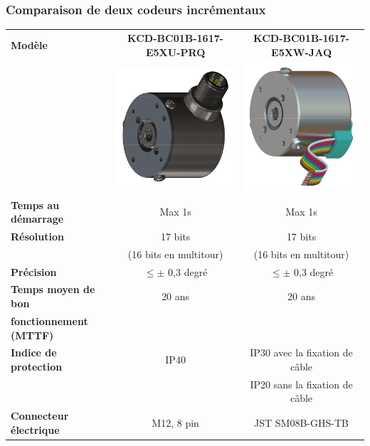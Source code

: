 \documentclass{article}
\begin{document}
    \subsubsection{Comparaison de deux codeurs incrémentaux}
    \begin{table}[H]
        \centering
        \begin{tabular}{l|c|c}
        \textbf{Modèle}
            & \textbf{KCD-BC01B-1617-E5XU-PRQ}
            & \textbf{KCD-BC01B-1617-E5XW-JAQ}\\
            & \includegraphics[width=0.2\linewidth]{./images/hall-KCD-BC01_B-1_617-E5XU-PRQ.png}
            & \includegraphics[width=0.2\linewidth]{./images/hall-KCD-S10_1B-1617-F7_XU-PRQ.png}\\
        \hline
        \textbf{Temps au démarrage}     & Max 1s                & Max 1s\\
        \hline
        \textbf{Résolution}             & 17 bits               & 17 bits\\
        \textbf{} & (16 bits en multitour) & (16 bits en multitour)\\
        \hline
        \textbf{Précision}              & $\le \pm$ 0,3 degré   & $\le \pm$ 0,3 degré\\
        \hline
        \textbf{Temps moyen de bon}     & 20 ans                & 20 ans\\
        \textbf{fonctionnement (MTTF)} & & \\
        \hline
        \textbf{Indice de protection}   & IP40                  & IP30 avec la fixation de câble\\
        \textbf{}                       &                       & IP20 sans la fixation de câble\\
        \hline
        \textbf{Connecteur électrique}  & M12, 8 pin            & JST SM08B-GHS-TB\\
    \end{tabular}
    \end{table}
        
\end{document}
